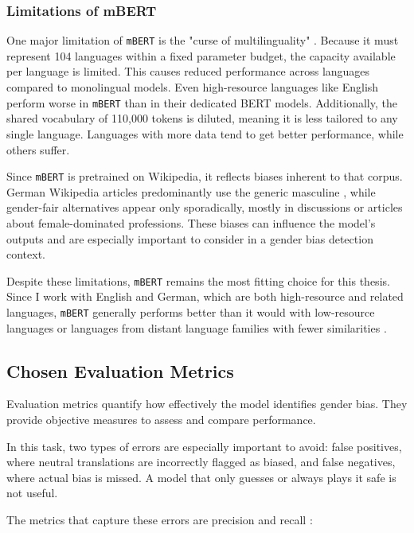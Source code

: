 \subsubsection{Limitations of mBERT}
    One major limitation of \texttt{mBERT} is the "curse of multilinguality" \parencite{gurgurovMultilingualLargeLanguage2024}. Because it must represent 104 languages within a fixed parameter budget, the capacity available per language is limited. This causes reduced performance across languages compared to monolingual models. Even high-resource languages like English perform worse in \texttt{mBERT} than in their dedicated BERT models. Additionally, the shared vocabulary of 110,000 tokens is diluted, meaning it is less tailored to any single language. Languages with more data tend to get better performance, while others suffer.

    Since \texttt{mBERT} is pretrained on Wikipedia, it reflects biases inherent to that corpus. German Wikipedia articles predominantly use the generic masculine \parencite{sichlerGenderDifferencesGermanlanguage2014}, while gender-fair alternatives appear only sporadically, mostly in discussions or articles about female-dominated professions. These biases can influence the model’s outputs and are especially important to consider in a gender bias detection context.

    Despite these limitations, \texttt{mBERT} remains the most fitting choice for this thesis. Since I work with English and German, which are both high-resource and related languages, \texttt{mBERT} generally performs better than it would with low-resource languages or languages from distant language families with fewer similarities \parencite{lauscherZeroHeroLimitations2020}.

\subsection{Chosen Evaluation Metrics}
    Evaluation metrics quantify how effectively the model identifies gender bias. They provide objective measures to assess and compare performance.

    In this task, two types of errors are especially important to avoid: false positives, where neutral translations are incorrectly flagged as biased, and false negatives, where actual bias is missed. A model that only guesses or always plays it safe is not useful. 

    The metrics that capture these errors are precision and recall \parencite{rainioEvaluationMetricsStatistical2024}:

